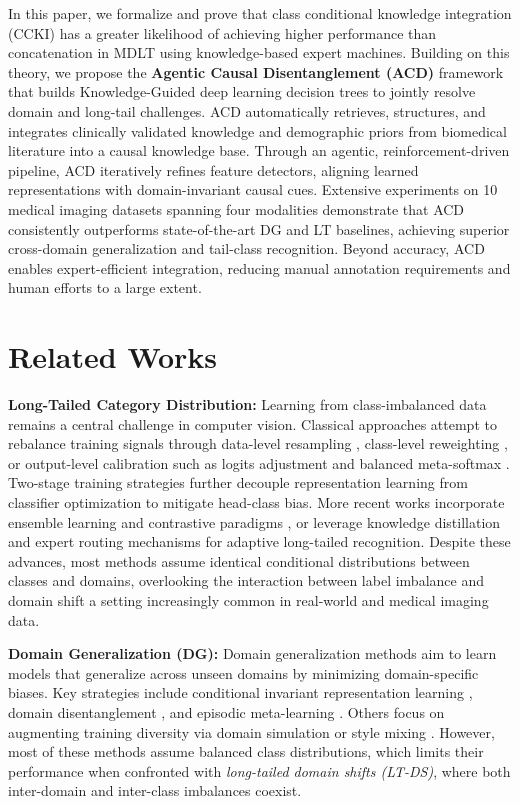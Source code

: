 \documentclass[runningheads]{llncs}
\begin{document}
In this paper, we formalize and prove that class conditional knowledge integration (CCKI) has a greater likelihood of achieving higher performance than concatenation in MDLT using knowledge-based expert machines.  Building on this theory, we propose the \textbf{Agentic Causal Disentanglement (ACD)} framework
that builds Knowledge-Guided deep learning decision trees to jointly resolve domain and long-tail challenges. ACD automatically retrieves, structures, and integrates clinically validated knowledge and demographic priors from biomedical literature into a causal knowledge base. Through an agentic, reinforcement-driven pipeline, ACD iteratively refines feature detectors, aligning learned representations with domain-invariant causal cues.  Extensive experiments on 10 medical imaging datasets spanning four modalities demonstrate that ACD consistently outperforms state-of-the-art DG and LT baselines, achieving superior cross-domain generalization and tail-class recognition. Beyond accuracy, ACD enables expert-efficient integration, reducing manual annotation requirements and human efforts to a large extent. 
\section{Related Works}
\label{sec:relWorks}
\textbf{Long-Tailed Category Distribution:}  
Learning from class-imbalanced data remains a central challenge in computer vision. Classical approaches attempt to rebalance training signals through data-level resampling \cite{Han05,Buda18}, class-level reweighting \cite{Huang16,Wang17}, or output-level calibration such as logits adjustment and balanced meta-softmax \cite{Hong21,Ren20}. Two-stage training strategies \cite{Kang19,Tang20} further decouple representation learning from classifier optimization to mitigate head-class bias. More recent works incorporate ensemble learning and contrastive paradigms \cite{Wang21contrast}, or leverage knowledge distillation \cite{Iscen21} and expert routing mechanisms \cite{Wang21routing} for adaptive long-tailed recognition. Despite these advances, most methods assume identical conditional distributions between classes and domains, overlooking the interaction between label imbalance and domain shift a setting increasingly common in real-world and medical imaging data.

\textbf{Domain Generalization (DG):}  
Domain generalization methods aim to learn models that generalize across unseen domains by minimizing domain-specific biases. Key strategies include conditional invariant representation learning \cite{Li18}, domain disentanglement \cite{Wang20disentangle,Gu20}, and episodic meta-learning \cite{Li19}. Others focus on augmenting training diversity via domain simulation or style mixing \cite{Dou19,Mancini20,Zhou21}. However, most of these methods assume balanced class distributions, which limits their performance when confronted with \textit{long-tailed domain shifts (LT-DS)}, where both inter-domain and inter-class imbalances coexist.
\end{document}
